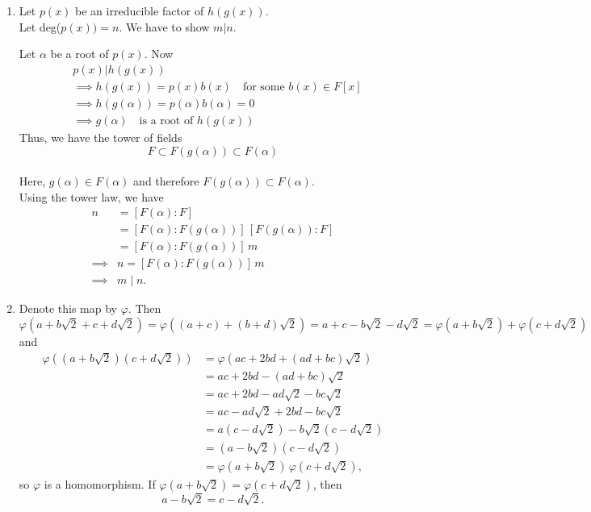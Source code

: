 \documentclass[12pt]{article}
\begin{document}
\begin{enumerate}
    \item[\bf{Soln 7}: ] Let $p(x)$ be an irreducible factor of $h(g(x))$.\\
    Let deg($p(x))=n$. We have to show $m|n$.

    Let $\alpha$ be a root of $p(x)$. Now 
    \[\begin{aligned}
        &p(x)|h(g(x))\\
    &\implies h(g(x))=p(x)b(x) \quad \text{for some $b(x) \in F[x]$}\\
    &\implies h(g(\alpha))=p(\alpha)b(\alpha)=0 \\
    &\implies g(\alpha) \quad \text{is a root of $h(g(x))$}    
    \end{aligned}\]
     Thus, we have the tower of fields 
     \[F \subset F(g(\alpha))\subset F(\alpha)\]\\
     Here, $g(\alpha) \in F(\alpha)$ and therefore $F(g(\alpha)) \subset F(\alpha)$.\\
    Using the tower law, we have
\[
\begin{aligned}
n 
&=   [F(\alpha):F] \\
&=   [F(\alpha):F(g(\alpha))]\,[F(g(\alpha)):F] \\
&=         [F(\alpha):F(g(\alpha))]\, m \\
\implies& n = [F(\alpha):F(g(\alpha))]\, m \\
\implies& m \mid n.
\end{aligned}
\]
    \item[\bf{Soln 8}: ]  Denote this map by $\varphi$. Then
    \[
    \varphi(a + b\sqrt{2} + c + d\sqrt{2})= \varphi((a +c)+ (b+d)\sqrt2)= a + c - b\sqrt{2} - d\sqrt{2} = \varphi(a + b\sqrt{2}) + \varphi(c + d\sqrt{2})\] and
    \[
    \begin{aligned}
    \varphi\!\left((a + b\sqrt{2})(c + d\sqrt{2})\right)
    &= \varphi(ac + 2bd + (ad + bc)\sqrt{2}) \\
    &= ac + 2bd - (ad + bc)\sqrt{2} \\
    &=ac+2bd-ad\sqrt2-bc\sqrt2\\
    &=ac- ad \sqrt2+2bd-bc\sqrt2 \\
    &=a(c-d\sqrt2)-b\sqrt2(c-d\sqrt2)\\
    &= (a - b\sqrt{2})(c - d\sqrt{2}) \\
    &= \varphi(a + b\sqrt{2})\,\varphi(c + d\sqrt{2}),
    \end{aligned}
    \]
    so $\varphi$ is a homomorphism. If $\varphi(a + b\sqrt{2}) = \varphi(c + d\sqrt{2})$, then
    \[
    a - b\sqrt{2} = c - d\sqrt{2}.
\]
\end{enumerate}
\end{document}
